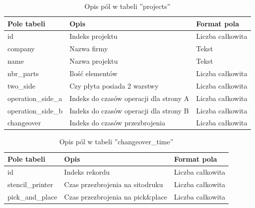 \begin{table}[H]
	\centering
	\caption{Opis pól w tabeli ''projects''}
	\begin{tabular}{lll}
		\toprule
		Pole tabeli        & Opis                                    & Format pola       \\
		\midrule
		id                 & Indeks projektu                         & Liczba całkowita \\
		company            & Nazwa firmy                             & Tekst             \\
		name               & Nazwa projektu                          & Tekst             \\
		nbr\_parts         & Ilość elementów                      & Liczba całkowita \\
		two\_side          & Czy płyta posiada 2 warstwy             & Liczba całkowita \\
		operation\_side\_a & Indeks do czasów operacji dla strony A & Liczba całkowita \\
		operation\_side\_b & Indeks do czasów operacji dla strony B & Liczba całkowita \\
		changeover         & Indeks do czasów przezbrojenia         & Liczba całkowita \\
		\bottomrule
	\end{tabular}
\end{table}

\begin{table}[H]
	\centering
	\caption{Opis pól w tabeli ''changeover\_time''}
	\begin{tabular}{lll}
		\toprule
		Pole tabeli      & Opis                              & Format pola       \\
		\midrule
		id               & Indeks rekordu                    & Liczba całkowita \\
		stencil\_printer & Czas przezbrojenia na sitodruku   & Liczba całkowita \\
		pick\_and\_place & Czas przezbrojenia na pick\&place & Liczba całkowita \\
		\bottomrule
	\end{tabular}
\end{table}

